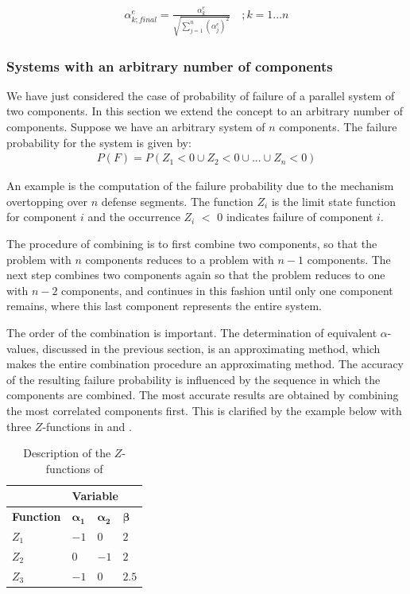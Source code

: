 {
\begin{align}
\alpha _{k;final}^{e} =\frac{\alpha _{k}^{e} }{\sqrt{\sum _{j=1}^{n}\left(\alpha _{j}^{e} \right)^{2}  } } \quad ;k=1...n\label{0.122)} 
\end{align}

\subsubsection{Systems with an arbitrary number of components}\label{Section_2.4.2.5}

We have just considered the case of probability of failure of a parallel system of two components. In this section we extend the concept to an arbitrary number of components. Suppose we have an arbitrary system of $n$ components. The failure probability for the system is given by: 
\begin{align}
P(F)=P(Z_{1} <0  \cup   Z_{2} <0  \cup ...\cup Z_{n} <0)\label{0.123)}  
\end{align}

An example is the computation of the failure probability due to the mechanism overtopping over $n$ defense segments. The function $Z_i$ is the limit state function for component $i$ and the occurrence $Z_i$ $<$ $0$ indicates failure of component $i$. 

The procedure of combining is to first combine two components, so that the problem with $n$ components reduces to a problem with $n-1$ components. The next step combines two components again so that the problem reduces to one with $n-2$ components, and continues in this fashion until only one component remains, where this last component represents the entire system. 

The order of the combination is important. The determination of equivalent $\alpha$-values, discussed in the previous section, is an approximating method, which makes the entire combination procedure an approximating method. The accuracy of the resulting failure probability is influenced by the sequence in which the components are combined. The most accurate results are obtained by combining the most correlated components first. This is clarified by the example below with three $Z$-functions in  and . 

\begin{longtable}{|p{0.7in}|p{0.5in}|p{0.5in}|p{0.5in}|}
\caption{Description of the $Z$-functions of }\label{tab:2.5} \\ \hline 
 & \multicolumn{3}{|p{1.5in}|}{\textbf{Variable}} \\ \hline 
\textbf{Function} & $\mathbf{\alpha_1}$ & $\mathbf{\alpha_2}$ & $\mathbf{\beta}$ \\ \hline 
$Z_1$ & $-1$ & $0$ & $2$ \\ \hline 
$Z_2$ & $0$ & $-1$ & $2$ \\ \hline 
$Z_3$ & $-1$ & $0$ & $2.5$ \\ \hline 
\end{longtable}

}
